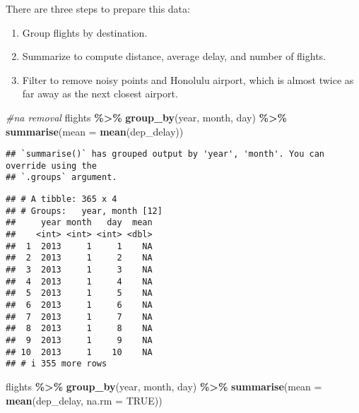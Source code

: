\documentclass[
]{article}
\newenvironment{Shaded}{\begin{snugshade}}{\end{snugshade}}
\newcommand{\AttributeTok}[1]{\textcolor[rgb]{0.13,0.29,0.53}{#1}}
\newcommand{\CommentTok}[1]{\textcolor[rgb]{0.56,0.35,0.01}{\textit{#1}}}
\newcommand{\ConstantTok}[1]{\textcolor[rgb]{0.56,0.35,0.01}{#1}}
\newcommand{\FunctionTok}[1]{\textcolor[rgb]{0.13,0.29,0.53}{\textbf{#1}}}
\newcommand{\NormalTok}[1]{#1}
\newcommand{\SpecialCharTok}[1]{\textcolor[rgb]{0.81,0.36,0.00}{\textbf{#1}}}
\providecommand{\tightlist}{%
  \setlength{\itemsep}{0pt}\setlength{\parskip}{0pt}}
\begin{document}
There are three steps to prepare this data:

\begin{enumerate}
\def\labelenumi{\arabic{enumi}.}
\tightlist
\item
  Group flights by destination.
\item
  Summarize to compute distance, average delay, and number of flights.
\item
  Filter to remove noisy points and Honolulu airport, which is almost
  twice as far away as the next closest airport.
\end{enumerate}

\begin{Shaded}
\begin{Highlighting}[]
\CommentTok{\#na removal}
\NormalTok{flights }\SpecialCharTok{\%\textgreater{}\%} 
  \FunctionTok{group\_by}\NormalTok{(year, month, day) }\SpecialCharTok{\%\textgreater{}\%} 
  \FunctionTok{summarise}\NormalTok{(}\AttributeTok{mean =} \FunctionTok{mean}\NormalTok{(dep\_delay))}
\end{Highlighting}
\end{Shaded}

\begin{verbatim}
## `summarise()` has grouped output by 'year', 'month'. You can override using the
## `.groups` argument.
\end{verbatim}

\begin{verbatim}
## # A tibble: 365 x 4
## # Groups:   year, month [12]
##     year month   day  mean
##    <int> <int> <int> <dbl>
##  1  2013     1     1    NA
##  2  2013     1     2    NA
##  3  2013     1     3    NA
##  4  2013     1     4    NA
##  5  2013     1     5    NA
##  6  2013     1     6    NA
##  7  2013     1     7    NA
##  8  2013     1     8    NA
##  9  2013     1     9    NA
## 10  2013     1    10    NA
## # i 355 more rows
\end{verbatim}

\begin{Shaded}
\begin{Highlighting}[]
\NormalTok{flights }\SpecialCharTok{\%\textgreater{}\%} 
  \FunctionTok{group\_by}\NormalTok{(year, month, day) }\SpecialCharTok{\%\textgreater{}\%} 
  \FunctionTok{summarise}\NormalTok{(}\AttributeTok{mean =} \FunctionTok{mean}\NormalTok{(dep\_delay, }\AttributeTok{na.rm =} \ConstantTok{TRUE}\NormalTok{))}
\end{Highlighting}
\end{Shaded}
\end{document}
